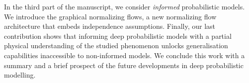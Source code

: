In the third part of the manuscript, we consider \textit{informed} probabilistic models. We introduce the graphical normalizing flows, a new normalizing flow architecture that embeds independence assumptions. Finally, our last contribution shows that informing deep probabilistic models with a partial physical understanding of the studied phenomenon unlocks generalisation capabilities inaccessible to non-informed models. We conclude this work with a summary and a brief prospect of the future developments in deep probabilistic modelling.
